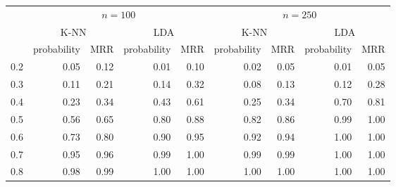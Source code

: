 \documentclass{article}
\begin{document}

\begin{table}[ht]
\begin{center}
\begin{tabular}{r|rr|rr|rr|rr|}
  \cline{2-9}
  & \multicolumn{4}{|c|}{$n = 100$} & \multicolumn{4}{c|}{$n = 250$}
  \\ \cline{2-9}
  & \multicolumn{2}{|c|}{K-NN} & \multicolumn{2}{|c|}{LDA} &
  \multicolumn{2}{|c|}{K-NN} & \multicolumn{2}{|c|}{LDA} \\ \cline{2-9}
 & probability & MRR & probability & MRR & probability & MRR & probability & MRR \\ 
  \hline
0.2 & 0.05 & 0.12 & 0.01 & 0.10 & 0.02 & 0.05 & 0.01 & 0.05 \\ 
  0.3 & 0.11 & 0.21 & 0.14 & 0.32 & 0.08 & 0.13 & 0.12 & 0.28 \\ 
  0.4 & 0.23 & 0.34 & 0.43 & 0.61 & 0.25 & 0.34 & 0.70 & 0.81 \\ 
  0.5 & 0.56 & 0.65 & 0.80 & 0.88 & 0.82 & 0.86 & 0.99 & 1.00 \\ 
  0.6 & 0.73 & 0.80 & 0.90 & 0.95 & 0.92 & 0.94 & 1.00 & 1.00 \\ 
  0.7 & 0.95 & 0.96 & 0.99 & 1.00 & 0.99 & 0.99 & 1.00 & 1.00 \\ 
  0.8 & 0.98 & 0.99 & 1.00 & 1.00 & 1.00 & 1.00 & 1.00 & 1.00 \\ 
   \hline
\end{tabular}
\end{center}
\end{table}
\end{document}
